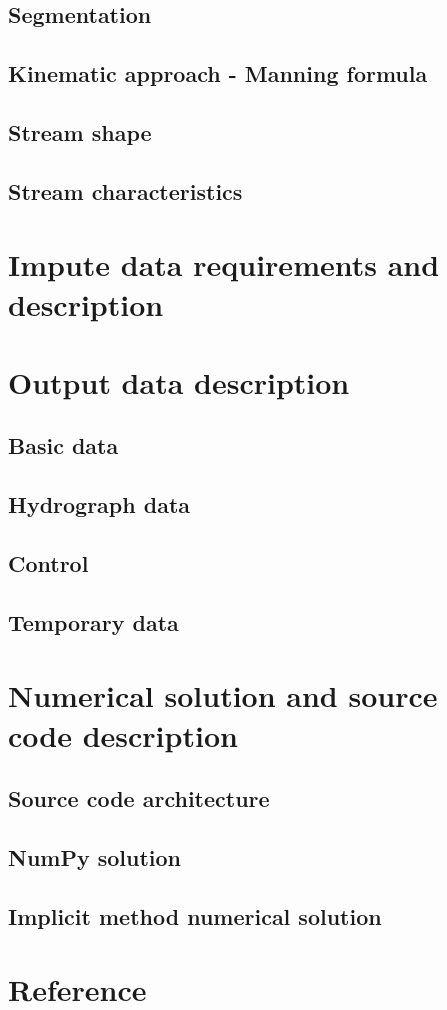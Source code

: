     \subsection{Segmentation}
    \subsection{Kinematic approach - Manning formula}
    \subsection{Stream shape}
    \subsection{Stream characteristics}

\section{Impute data requirements and description}

\section{Output data description}

    \subsection{Basic data}
    \subsection{Hydrograph data}
    \subsection{Control}
    \subsection{Temporary data}

\section{Numerical solution and source code description}

    \subsection{Source code architecture}
    \subsection{NumPy solution}
    \subsection{Implicit method numerical solution}

\section{Reference}




%
%

%
